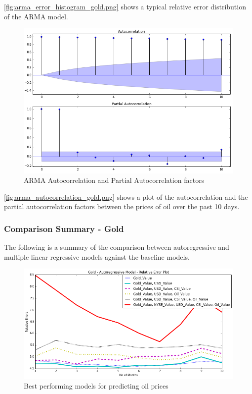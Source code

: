 \documentclass[runningheads]{llncs}
\begin{document}
\noindent \autoref{fig:arma_error_histogram_gold.png} shows a typical relative error distribution of the ARMA model.

\begin{center}
\begin{figure}
\centering
\includegraphics[width=\textwidth]{arma_autocorrelation_gold.png}
\caption{ARMA Autocorrelation and Partial Autocorrelation factors}
\label{fig:arma_autocorrelation_gold.png}
\end{figure}
\end{center}

\noindent \autoref{fig:arma_autocorrelation_gold.png} shows a plot of the autocorrelation and the partial autocorrelation factors between the prices of oil over the past 10 days. \\


\newpage
\subsubsection {Comparison Summary - Gold} The following is a summary of the comparison between autoregressive and multiple linear regressive models against the baseline models. \\


\begin{figure}
\centering
\includegraphics[width=\textwidth]{gold_autoregressive_bestModels.png}
\caption{Best performing models for predicting oil prices}
\label{fig:gold_autoregressive_bestModels.png}
\end{figure}
\end{document}

